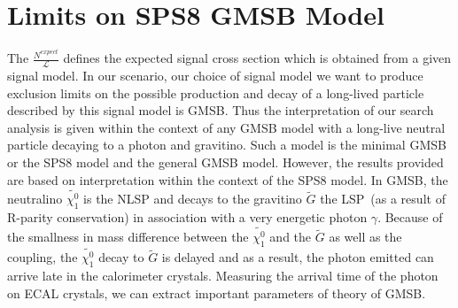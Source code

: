\section{Limits on SPS8 GMSB Model}
The $\frac{N^{expect}}{\mathscr{L}}$ defines the expected signal cross section which is obtained from a given signal model. In our scenario, our choice of signal model we  want to produce exclusion limits on the possible production and decay of a long-lived particle described by this signal model is GMSB.
Thus the interpretation of our search analysis is given within the context of any GMSB model with a long-live neutral particle decaying to a photon and gravitino. Such a model is the minimal GMSB or the SPS8 model and the general GMSB model. However, the results provided are based on interpretation within the context of the SPS8 model.
In GMSB, the neutralino $\tilde{\chi^{0}_{1}}$ is the NLSP and decays to the gravitino $\tilde{G}$ the LSP~(as a result of R-parity conservation) in association with a very energetic photon $\gamma$. Because of the smallness in mass difference between the  $\tilde{\chi^{0}_{1}}$ and the $\tilde{G}$ as well as the coupling, the $\tilde{\chi^{0}_{1}}$ decay to $\tilde{G}$ is delayed and as a result, the photon emitted can arrive late in the calorimeter crystals.  Measuring the arrival time of the photon on ECAL crystals, we can extract important parameters of  theory of GMSB.

